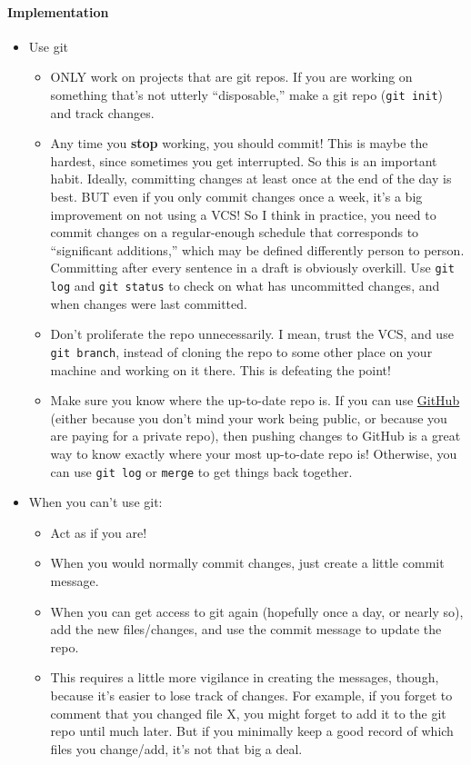 \documentclass[11pt]{article}
\begin{document}
\paragraph{Implementation}
\label{sec-3-1-3-2}

\begin{itemize}
\item Use git
\begin{itemize}
\item ONLY work on projects that are git repos.  If you are working on something that's not utterly ``disposable,'' make a git repo (\texttt{git init}) and track changes.
\item Any time you \textbf{stop} working, you should commit! This is maybe the hardest, since sometimes you get interrupted.  So this is an important habit.  Ideally, committing changes at least once at the end of the day is best.  BUT even if you only commit changes once a week, it's a big improvement on not using a VCS!  So I think in practice, you need to commit changes on a regular-enough schedule that corresponds to ``significant additions,'' which may be defined differently person to person.  Committing after every sentence in a draft is obviously overkill.  Use \texttt{git log} and \texttt{git status} to check on what has uncommitted changes, and when changes were last committed.
\item Don't proliferate the repo unnecessarily.  I mean, trust the VCS, and use \texttt{git branch}, instead of cloning the repo to some other place on your machine and working on it there. This is defeating the point!
\item Make sure you know where the up-to-date repo is.  If you can use \href{https://github.com/}{GitHub} (either because you don't mind your work being public, or because you are paying for a private repo), then pushing changes to GitHub is a great way to know exactly where your most up-to-date repo is!  Otherwise, you can use \texttt{git log} or \texttt{merge} to get things back together.
\end{itemize}
\item When you can't use git:
\begin{itemize}
\item Act as if you are!
\item When you would normally commit changes, just create a little commit message.
\item When you can get access to git again (hopefully once a day, or nearly so), add the new files/changes, and use the commit message to update the repo.
\item This requires a little more vigilance in creating the messages, though, because it's easier to lose track of changes.  For example, if you forget to comment that you changed file X, you might forget to add it to the git repo until much later.  But if you minimally keep a good record of which files you change/add, it's not that big a deal.
\end{itemize}
\end{itemize}
\end{document}
